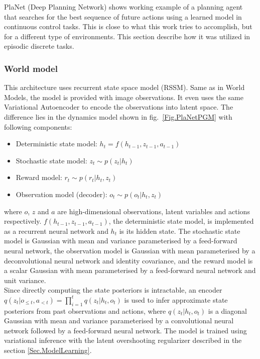 PlaNet (Deep Planning Network) \cite{Algo.PlaNet} shows working example of a planning agent that searches for the best sequence of future actions using a learned model in continuous control tasks. This is close to what this work tries to accomplish, but for a different type of environments. This section describe how it was utilized in episodic discrete tasks.

\subsubsection{World model}

This architecture uses recurrent state space model (RSSM). Same as in World Models, the model is provided with image observations. It even uses the same Variational Autoencoder to encode the observations into latent space. The difference lies in the dynamics model shown in fig.~\ref{Fig.PlaNetPGM} with following components:
\begin{itemize}
\item Deterministic state model:             $h_t = f(h_{t-1}, z_{t-1}, a_{t-1})$
\item Stochastic state model:                $z_t \sim p(z_t|h_t)$
\item Reward model:                          $r_t \sim p(r_t|h_t, z_t)$
\item Observation model (decoder):           $o_t \sim p(o_t|h_t, z_t)$
\end{itemize}
where $o$, $z$ and $a$ are high-dimensional observations, latent variables and actions respectively. $f(h_{t-1}, z_{t-1}, a_{t-1})$, the deterministic state model, is implemented as a recurrent neural network and $h_t$ is its hidden state. The stochastic state model is Gaussian with mean and variance parameterised by a feed-forward neural network, the observation model is Gaussian with mean parameterised by a deconvolutional neural network and identity covariance, and the reward model is a scalar Gaussian with mean parameterised by a feed-forward neural network and unit variance. \\
Since directly computing the state posteriors is intractable, an encoder $q(z_t|o_{\leqslant t}, a_{< t}) = \prod_{i=1}^tq(z_t|h_t,o_t)$ is used to infer approximate state posteriors from past observations and actions, where $q(z_t | h_t, o_t)$ is a diagonal Gaussian with mean and variance parameterised by a convolutional neural network followed by a feed-forward neural network. The model is trained using variational inference with the latent overshooting regularizer described in the section \ref{Sec.ModelLearning}.

